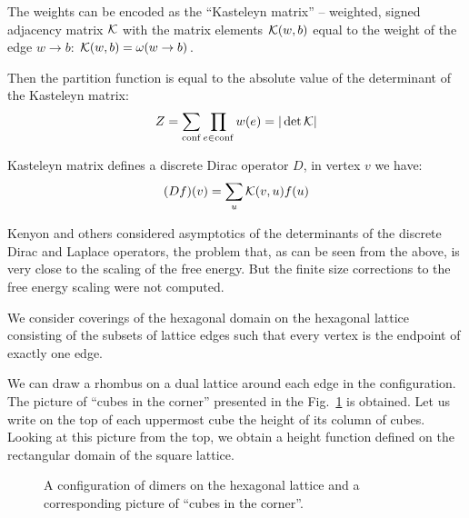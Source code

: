 \documentclass{article}
\begin{document}
The weights can be encoded as the ``Kasteleyn matrix'' -- weighted, signed adjacency matrix ${\cal K}$ with
the matrix elements ${\cal K}(w,b)$ equal to the weight of the edge $w\to b$: ${\cal K}(w,b)=\omega(w\to b)$.

Then the partition function is equal to the absolute value of the determinant of the Kasteleyn
matrix\cite{P.W-1961,doi:10.1080/14786436108243366}: 
\begin{equation}
  \label{eq:15}
  Z=\sum_{\mathrm{conf}}\prod_{e\in \mathrm{conf}}w(e)=|\det {\cal K}|
\end{equation}

Kasteleyn matrix defines a discrete Dirac operator $D$, in vertex $v$ we have:
\begin{equation}
  \label{eq:16}
  (Df)(v)=\sum_{u}{\cal K}(v,u) f(u)
\end{equation}

Kenyon \cite{kenyon2002laplacian,kenyon2000asymptotic} and others \cite{sridhar2015asymptotic}
considered asymptotics of the determinants of the discrete Dirac and Laplace operators, the problem
that, as can be seen from the above, is very close to the scaling of the free energy. But the finite
size corrections to the free energy scaling were not computed. 
  
We consider coverings of the hexagonal domain on the hexagonal lattice consisting of the subsets of
lattice edges such that every vertex is the endpoint of exactly one edge.

We can draw a rhombus on a dual lattice around each edge in the configuration. The picture of
``cubes in the corner'' presented in the Fig.~\ref{dhf} is obtained. Let us write on the top of each
uppermost cube the height of its column of cubes. Looking at this picture from the top, we obtain a
height function defined on the rectangular domain of the square lattice. 

\begin{figure}[htbp]
\caption{\label{dhf}A configuration of dimers on the hexagonal lattice and a corresponding picture
  of ``cubes in the corner''.}
\end{figure}
\end{document}
